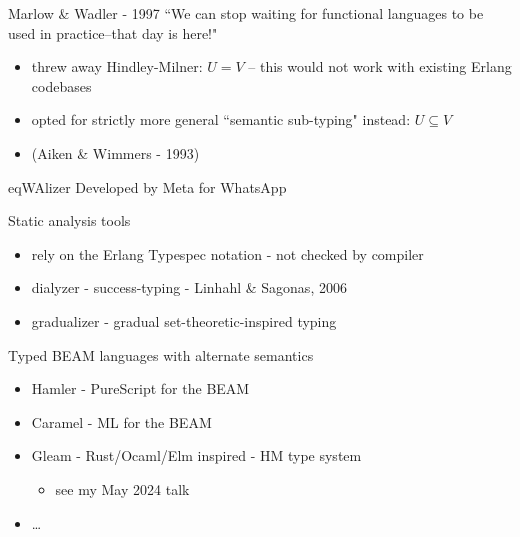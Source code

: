 \documentclass[
  ignorenonframetext,
  aspectratio=169]{beamer}
\providecommand{\tightlist}{%
  \setlength{\itemsep}{0pt}\setlength{\parskip}{0pt}}
\begin{document}
\begin{frame}{Marlow \& Wadler - 1997}
\label{marlow-wadler---1997}
\centering
``We can stop waiting for functional languages to be used in practice--that day is here!"

\begin{itemize}
\tightlist
\item
  threw away Hindley-Milner: \(U = V\) -- this would not work with
  existing Erlang codebases
\item
  opted for strictly more general ``semantic sub-typing" instead:
  \(U \subseteq V\)
\item
  (Aiken \& Wimmers - 1993)
\end{itemize}
\end{frame}

\begin{frame}{eqWAlizer}
\label{eqwalizer}
Developed by Meta for WhatsApp
\end{frame}

\begin{frame}{Static analysis tools}
\label{static-analysis-tools}
\begin{itemize}
\tightlist
\item
  rely on the Erlang Typespec notation - not checked by compiler
\item
  dialyzer - success-typing - Linhahl \& Sagonas, 2006
\item
  gradualizer - gradual set-theoretic-inspired typing
\end{itemize}
\end{frame}

\begin{frame}{Typed BEAM languages with alternate semantics}
\label{typed-beam-languages-with-alternate-semantics}
\begin{itemize}
\tightlist
\item
  Hamler - PureScript for the BEAM
\item
  Caramel - ML for the BEAM
\item
  Gleam - Rust/Ocaml/Elm inspired - HM type system

  \begin{itemize}
  \tightlist
  \item
    see my May 2024 talk
  \end{itemize}
\item
  \ldots{}
\end{itemize}
\end{frame}
\end{document}
